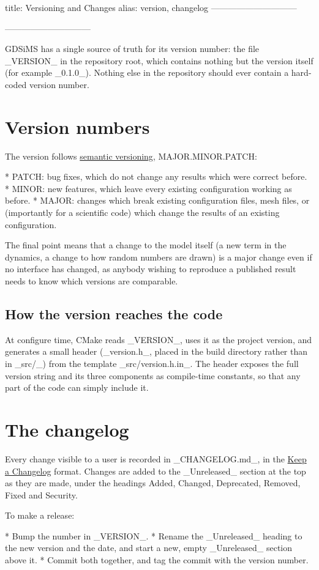title: Versioning and Changes
alias: version, changelog
------------------------------
\usepackage{hyperref}
\hypersetup{colorlinks=true,linkcolor=blue,urlcolor=blue}
------------------------------

GDSiMS has a single source of truth for its version number: the file _VERSION_ in the repository root, which contains nothing but the version itself (for example _0.1.0_). Nothing else in the repository should ever contain a hard-coded version number.



\section{Version numbers}

	The version follows \href{https://semver.org/}{semantic versioning}, MAJOR.MINOR.PATCH:

	* PATCH: bug fixes, which do not change any results which were correct before.
	* MINOR: new features, which leave every existing configuration working as before.
	* MAJOR: changes which break existing configuration files, mesh files, or (importantly for a scientific code) which change the results of an existing configuration.

	The final point means that a change to the model itself (a new term in the dynamics, a change to how random numbers are drawn) is a major change even if no interface has changed, as anybody wishing to reproduce a published result needs to know which versions are comparable.

	\subsection{How the version reaches the code}

		At configure time, CMake reads _VERSION_, uses it as the project version, and generates a small header (_version.h_, placed in the build directory rather than in _src/_) from the template _src/version.h.in_. The header exposes the full version string and its three components as compile-time constants, so that any part of the code can simply include it.
\section{The changelog}

	Every change visible to a user is recorded in _CHANGELOG.md_, in the \href{https://keepachangelog.com/}{Keep a Changelog} format. Changes are added to the _Unreleased_ section at the top as they are made, under the headings Added, Changed, Deprecated, Removed, Fixed and Security.

	To make a release:

	* Bump the number in _VERSION_.
	* Rename the _Unreleased_ heading to the new version and the date, and start a new, empty _Unreleased_ section above it.
	* Commit both together, and tag the commit with the version number.
